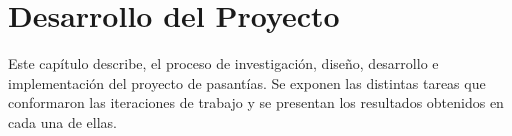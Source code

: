 \chapter{Desarrollo del Proyecto} \label{chap:desarrollo}

\vspace{5 mm}

Este capítulo describe, el proceso de investigación, diseño, desarrollo e implementación del proyecto de pasantías. Se exponen las distintas tareas que conformaron las  iteraciones de trabajo y se presentan los resultados obtenidos en cada una de ellas.

